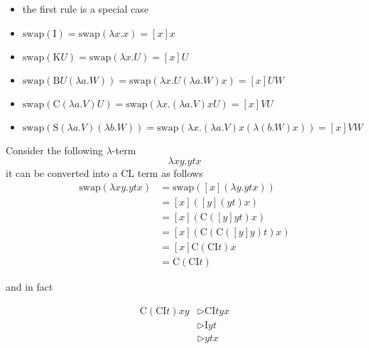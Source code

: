\documentclass[a4paper, 12pt]{report}
\begin{document}
    \begin{itemize}
        \item the first rule is a special case
        \item $\mathrm{swap}(\mathrm I) = \mathrm{swap}(\lambda x.x) = [x] x$
        \item $\mathrm{swap}(\mathrm K U) = \mathrm{swap}(\lambda x.U) = [x]U$
        \item $\mathrm{swap}(\mathrm B U(\lambda a.W))=\mathrm{swap}(\lambda x.U(\lambda a.W)x) = [x]UW$
        \item $\mathrm{swap}(\mathrm C(\lambda a.V)U) = \mathrm{swap}(\lambda x.(\lambda a.V)xU) = [x]VU$
        \item $\mathrm{swap}(\mathrm S (\lambda a. V)(\lambda b . W) ) = \mathrm{swap}(\lambda x.(\lambda a. V)x(\lambda(b.W)x)) = [x]VW$
    \end{itemize}

    \begin{example}
        Consider the following $\lambda$-term $$\lambda xy. ytx$$ it can be converted into a CL term as follows
        \begin{equation*}
            \begin{split}
                \mathrm{swap}(\lambda xy. ytx) &= \mathrm{swap}([x](\lambda y. ytx)) \\
                                               &= [x]([y](yt)x) \\
                                               &= [x](\mathrm C([y]yt)x) \\
                                               &= [x](\mathrm C(\mathrm C([y]y)t)x) \\
                                               &= [x]\mathrm C(\mathrm C \mathrm I t)x \\
                                               &= \mathrm C(\mathrm C \mathrm It)
            \end{split}
        \end{equation*}

        and in fact

        \begin{equation*}
            \begin{split}
                \mathrm C (\mathrm C\mathrm I t)xy &\triangleright \mathrm C \mathrm I t y x \\
                                                   &\triangleright \mathrm I y t \\
                                                   &\triangleright ytx
            \end{split}
        \end{equation*}
    \end{example}
\end{document}
